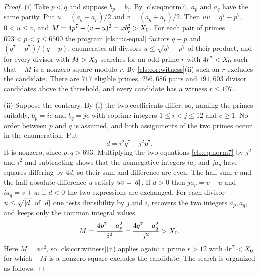 \begin{proof}
(i) Take $p<q$ and suppose $b_p=b_q$. By \eqref{cls:eq:norm7}, $a_p$ and $a_q$ have the
same parity. Put $u=(a_q-a_p)/2$ and $v=(a_q+a_p)/2$. Then $uv=q^7-p^7$, $0<u\le v$, and
$M=4p^7-(v-u)^2=xb_p^2>X_0$. For each pair of primes $693<p<q\le6500$ the program
\ref{cls:it:c-equal} factors $q-p$ and $(q^7-p^7)/(q-p)$, enumerates all divisors $u\le\sqrt{q^7-p^7}$ of their product, and for
every divisor with $M>X_0$ searches for an odd prime $r$ with $4r^7<X_0$ such that
$-M$ is a nonzero square modulo $r$. By \cref{cls:cor:witness}(ii) such an $r$ excludes
the candidate. There are $717$ eligible primes, $256{,}686$ pairs and $191{,}603$ divisor
candidates above the threshold, and every candidate has a witness $r\le107$.

(ii) Suppose the contrary. By (i) the two coefficients differ, so, naming the primes
suitably, $b_p=ic$ and $b_q=jc$ with coprime integers $1\le i<j\le12$ and $c\ge1$. No
order between $p$ and $q$ is assumed, and both assignments of the two primes occur in the
enumeration. Put
\[
   d=i^2q^7-j^2p^7 .
\]
It is nonzero, since $p,q>693$. Multiplying the two equations \eqref{cls:eq:norm7} by
$j^2$ and $i^2$ and subtracting shows that the nonnegative integers $ia_q$ and $ja_p$
have squares differing by $4d$, so their sum and difference are even. The half sum $v$
and the half absolute difference $u$ satisfy $uv=\lvert d\rvert$. If $d>0$ then $ja_p=v-u$ and
$ia_q=v+u$; if $d<0$ the two expressions are exchanged. For each divisor $u\le\sqrt{\lvert d\rvert}$
of $\lvert d\rvert$ one tests divisibility by $j$ and $i$, recovers the two integers $a_p,a_q$, and
keeps only the common integral values
\[
        M=\frac{4p^7-a_p^2}{i^2}=\frac{4q^7-a_q^2}{j^2}>X_0 .
\]
Here $M=xc^2$, so \cref{cls:cor:witness}(ii) applies again: a prime $r>12$ with
$4r^7<X_0$ for which $-M$ is a nonzero square excludes the candidate. The search is
organized as follows.


\end{proof}
